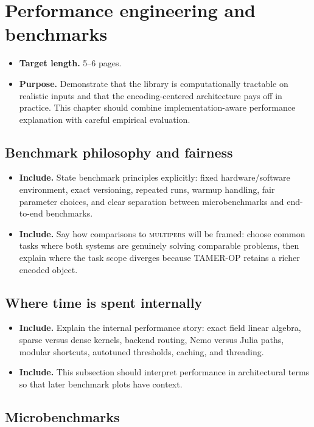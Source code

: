 \documentclass[11pt]{article}
\newcommand{\TAMER}{\textsc{TAMER-OP}}
\newcommand{\multipers}{\textsc{multipers}}
\newenvironment{plan}{\begin{itemize}[leftmargin=1.6em,itemsep=0.35em,topsep=0.25em]}{\end{itemize}}
\newcommand{\target}[1]{\item \textbf{Target length.} #1}
\newcommand{\purpose}[1]{\item \textbf{Purpose.} #1}
\newcommand{\includeitems}[1]{\item \textbf{Include.} #1}
\begin{document}
\section{Performance engineering and benchmarks}\label{sec:benchmarks}

\begin{plan}
    \target{5--6 pages.}
    \purpose{Demonstrate that the library is computationally tractable on realistic inputs and that the encoding-centered architecture pays off in practice. This chapter should combine implementation-aware performance explanation with careful empirical evaluation.}
\end{plan}

\subsection{Benchmark philosophy and fairness}

\begin{plan}
    \includeitems{State benchmark principles explicitly: fixed hardware/software environment, exact versioning, repeated runs, warmup handling, fair parameter choices, and clear separation between microbenchmarks and end-to-end benchmarks.}
    \includeitems{Say how comparisons to \multipers{} will be framed: choose common tasks where both systems are genuinely solving comparable problems, then explain where the task scope diverges because \TAMER{} retains a richer encoded object.}
\end{plan}

\subsection{Where time is spent internally}

\begin{plan}
    \includeitems{Explain the internal performance story: exact field linear algebra, sparse versus dense kernels, backend routing, Nemo versus Julia paths, modular shortcuts, autotuned thresholds, caching, and threading.}
    \includeitems{This subsection should interpret performance in architectural terms so that later benchmark plots have context.}
\end{plan}

\subsection{Microbenchmarks}
\end{document}
